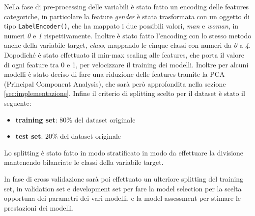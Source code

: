 Nella fase di pre-processing delle variabili è stato fatto un encoding delle features categoriche, in particolare la feature \textit{gender} è stata trasformata con un oggetto di tipo \verb+LabelEncoder()+, che ha mappato i due possibili valori, \textit{man} e \textit{woman}, in numeri \textit{0} e \textit{1} rispettivamente.  Inoltre è stato fatto l'encoding con lo stesso metodo anche della variabile target, \textit{class}, mappando le cinque classi con numeri da \textit{0} a \textit{4}. Dopodiché è stato effettuato il min-max scaling alle features, che porta il valore di ogni feature tra 0 e 1, per velocizzare il training dei modelli.  Inoltre per alcuni modelli è stato deciso di fare una riduzione delle features tramite la PCA (Principal Component Analysis), che sarà però approfondita nella sezione \ref{sec:implementazione}.
Infine il criterio di splitting scelto per il dataset è stato il seguente:
\begin{itemize}
\item \textbf{training set}: 80\% del dataset originale
\item \textbf{test set}: 20\% del dataset originale
\end{itemize}
Lo splitting è stato fatto in modo stratificato in modo da effettuare la divisione mantenendo bilanciate le classi della variabile target.

In fase di cross validazione sarà poi effettuato un ulteriore splitting del training set, in validation set e development set per fare la model selection per la scelta opportuna dei parametri dei vari modelli, e la model assessment per stimare le prestazioni dei modelli. 